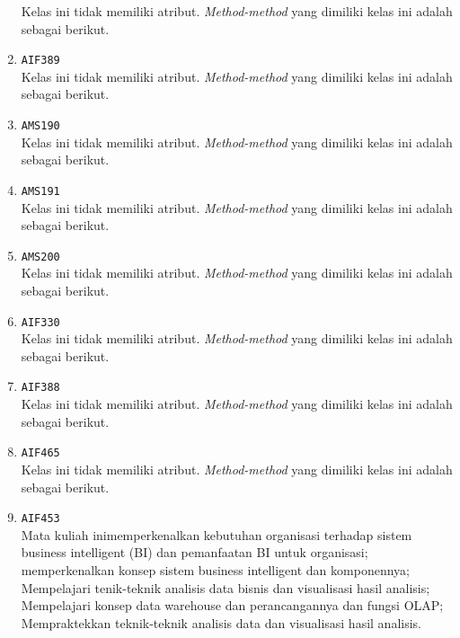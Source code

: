 \documentclass{article}
\begin{document}
\begin{enumerate}
Kelas ini tidak memiliki atribut. \textit{Method-method} yang dimiliki kelas ini adalah sebagai berikut.
\begin{itemize}
\end{itemize}
\item \texttt{AIF389}\\ 
Kelas ini tidak memiliki atribut. \textit{Method-method} yang dimiliki kelas ini adalah sebagai berikut.
\begin{itemize}
\end{itemize}
\item \texttt{AMS190}\\ 
Kelas ini tidak memiliki atribut. \textit{Method-method} yang dimiliki kelas ini adalah sebagai berikut.
\begin{itemize}
\end{itemize}
\item \texttt{AMS191}\\ 
Kelas ini tidak memiliki atribut. \textit{Method-method} yang dimiliki kelas ini adalah sebagai berikut.
\begin{itemize}
\end{itemize}
\item \texttt{AMS200}\\ 
Kelas ini tidak memiliki atribut. \textit{Method-method} yang dimiliki kelas ini adalah sebagai berikut.
\begin{itemize}
\end{itemize}
\item \texttt{AIF330}\\ 
Kelas ini tidak memiliki atribut. \textit{Method-method} yang dimiliki kelas ini adalah sebagai berikut.
\begin{itemize}
\end{itemize}
\item \texttt{AIF388}\\ 
Kelas ini tidak memiliki atribut. \textit{Method-method} yang dimiliki kelas ini adalah sebagai berikut.
\begin{itemize}
\end{itemize}
\item \texttt{AIF465}\\ 
Kelas ini tidak memiliki atribut. \textit{Method-method} yang dimiliki kelas ini adalah sebagai berikut.
\begin{itemize}
\end{itemize}
\item \texttt{AIF453}\\ 
Mata kuliah inimemperkenalkan kebutuhan organisasi terhadap sistem business
 intelligent (BI) dan pemanfaatan BI untuk organisasi; memperkenalkan konsep
 sistem business intelligent dan komponennya; Mempelajari tenik-teknik
 analisis data bisnis dan visualisasi hasil analisis; Mempelajari konsep data
 warehouse dan perancangannya dan fungsi OLAP; Mempraktekkan teknik-teknik
 analisis data dan visualisasi hasil analisis.


\end{enumerate}
\end{document}
